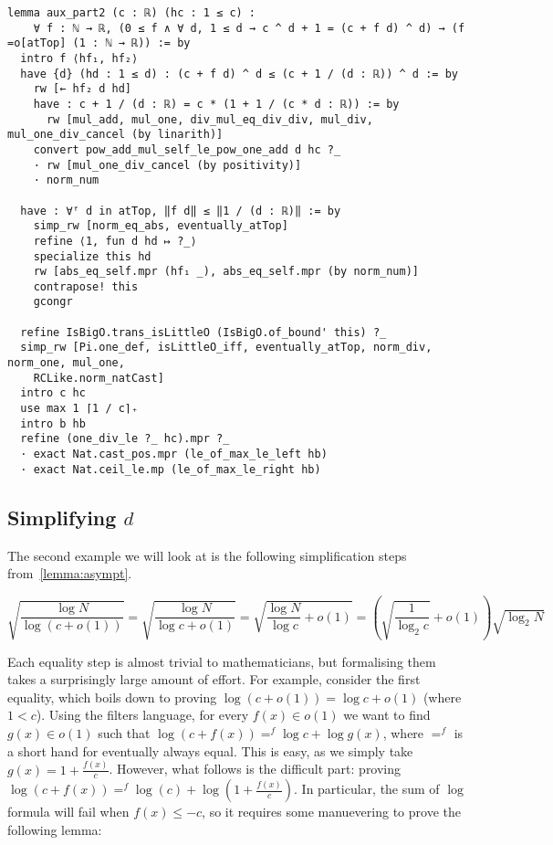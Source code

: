 \begin{verbatim}
lemma aux_part2 (c : ℝ) (hc : 1 ≤ c) :
    ∀ f : ℕ → ℝ, (0 ≤ f ∧ ∀ d, 1 ≤ d → c ^ d + 1 = (c + f d) ^ d) → (f =o[atTop] (1 : ℕ → ℝ)) := by
  intro f ⟨hf₁, hf₂⟩
  have {d} (hd : 1 ≤ d) : (c + f d) ^ d ≤ (c + 1 / (d : ℝ)) ^ d := by
    rw [← hf₂ d hd]
    have : c + 1 / (d : ℝ) = c * (1 + 1 / (c * d : ℝ)) := by
      rw [mul_add, mul_one, div_mul_eq_div_div, mul_div, mul_one_div_cancel (by linarith)]
    convert pow_add_mul_self_le_pow_one_add d hc ?_
    · rw [mul_one_div_cancel (by positivity)]
    · norm_num

  have : ∀ᶠ d in atTop, ‖f d‖ ≤ ‖1 / (d : ℝ)‖ := by
    simp_rw [norm_eq_abs, eventually_atTop]
    refine ⟨1, fun d hd ↦ ?_⟩
    specialize this hd
    rw [abs_eq_self.mpr (hf₁ _), abs_eq_self.mpr (by norm_num)]
    contrapose! this
    gcongr

  refine IsBigO.trans_isLittleO (IsBigO.of_bound' this) ?_
  simp_rw [Pi.one_def, isLittleO_iff, eventually_atTop, norm_div, norm_one, mul_one,
    RCLike.norm_natCast]
  intro c hc
  use max 1 ⌈1 / c⌉₊
  intro b hb
  refine (one_div_le ?_ hc).mpr ?_
  · exact Nat.cast_pos.mpr (le_of_max_le_left hb)
  · exact Nat.ceil_le.mp (le_of_max_le_right hb)
\end{verbatim}

\subsection{Simplifying \(d\)}

The second example we will look at is the following simplification steps from~\cref{lemma:asympt}.

\[
  \sqrt{\frac{\log N}{\log(c + o(1))}} = \sqrt{\frac{\log N}{\log c + o(1)}} = \sqrt{\frac{\log N}{\log c} + o(1)} = \left(\sqrt{\frac{1}{\log_2 c}} + o(1)\right)\sqrt{\log_2 N}
\]

Each equality step is almost trivial to mathematicians, but formalising them takes a surprisingly large amount of effort. For example, consider the first equality, which boils down to proving \(\log(c + o(1)) = \log c + o(1)\) (where \(1 < c\)). Using the filters language, for every \(f(x) \in o(1)\) we want to find \(g(x) \in o(1)\) such that \(\log(c + f(x)) =^f \log c + \log g(x)\), where \(=^f\) is a short hand for eventually always equal. This is easy, as we simply take \(g(x) = 1 + \frac{f(x)}{c}\). However, what follows is the difficult part: proving \(\log(c + f(x)) =^f \log(c) + \log\left(1 + \frac{f(x)}{c}\right)\). In particular, the sum of \(\log\) formula will fail when \(f(x) \leq -c\), so it requires some manuevering to prove the following lemma:

